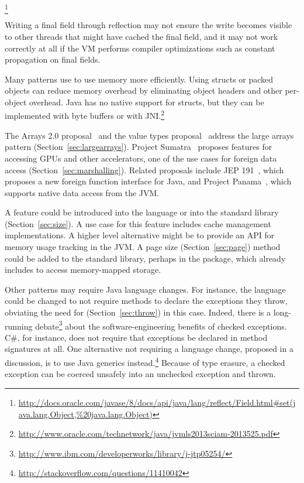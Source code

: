 \footnote{\url{http://docs.oracle.com/javase/8/docs/api/java/lang/reflect/Field.html\#set(java.lang.Object,\%20java.lang.Object)}}

Writing a final field through reflection may not ensure
the write becomes visible to other threads that might have cached the final
field, and it may not work correctly at all if the VM performs compiler
optimizations such as constant propagation on final fields.

Many patterns use \unsafe{} to use memory more efficiently.
Using structs or packed objects can reduce memory overhead by eliminating 
object headers and other per-object overhead.
Java has no native support for structs, but
they can be implemented with byte buffers or with
JNI.\footnote{\url{http://www.oracle.com/technetwork/java/jvmls2013sciam-2013525.pdf}}

The Arrays 2.0
proposal~\cite{arrays20} and the value types proposal~\cite{valuetypes}
address the large arrays pattern (Section~\ref{sec:largearrays}). 
Project Sumatra~\cite{layouts} proposes features for accessing GPUs
and other accelerators, one of the use cases for foreign data access
(Section~\ref{sec:marshalling}).
Related proposals include JEP 191~\cite{jep191}, which proposes a
new 
foreign function interface for Java, and Project Panama~\cite{panama},
which supports native data access from the JVM.

A  feature could be introduced into the language or
into the standard library (Section~\ref{sec:size}).
A use case for this feature includes cache management implementations.
A higher level alternative might be to provide an API for memory usage tracking in the
JVM.
A page size (Section~\ref{sec:page}) method could be added to 
the standard library, perhaps in
  the  package, which already includes
 to access memory-mapped storage.


Other patterns may require Java language changes. For instance, 
the language could be changed to not require methods to declare 
the exceptions they throw, obviating the need for \unsafe{}
(Section~\ref{sec:throw}) in this case.
  Indeed, there is a long-running
  debate\footnote{\url{http://www.ibm.com/developerworks/library/j-jtp05254/}} about the
  software-engineering benefits of checked exceptions.
C\#, for instance, does not require that exceptions be declared in method signatures at all.
One alternative not requiring a language change, proposed in a \stackoverflow
discussion, is to use Java generics
instead.\footnote{\url{http://stackoverflow.com/questions/11410042}} Because
of type erasure, a checked exception can be coerced unsafely into an unchecked exception and thrown.


